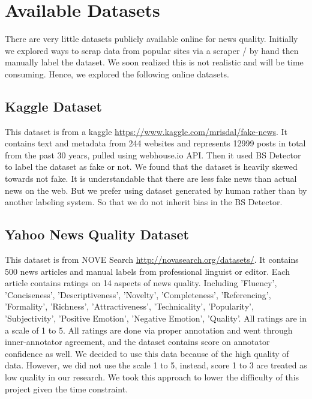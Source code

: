 \documentclass[11pt]{article}
\begin{document}
\section{Available Datasets}

There are very little datasets publicly available online for news quality. Initially we explored ways to scrap data from popular sites via a scraper / by hand then manually label the dataset. We soon realized this is not realistic and will be time consuming. Hence, we explored the following online datasets.

\subsection{Kaggle Dataset}

This dataset is from a kaggle \url{https://www.kaggle.com/mrisdal/fake-news}. It contains text and metadata from 244 websites and represents 12999 posts in total from the past 30 years, pulled using webhouse.io API. Then it used BS Detector to label the dataset as fake or not. We found that the dataset is heavily skewed towards not fake. It is understandable that there are less fake news than actual news on the web. But we prefer using dataset generated by human rather than by another labeling system. So that we do not inherit bias in the BS Detector.  

\subsection{Yahoo News Quality Dataset}

This dataset is from NOVE Search \url{http://novasearch.org/datasets/}. It contains 500 news articles and manual labels from professional linguist or editor. Each article contains ratings on 14 aspects of news quality. Including 'Fluency', 'Conciseness', 'Descriptiveness', 'Novelty', 'Completeness', 'Referencing', 'Formality', 'Richness', 'Attractiveness', 'Technicality', 'Popularity', 'Subjectivity', 'Positive Emotion', 'Negative Emotion', 'Quality'. All ratings are in a scale of 1 to 5. All ratings are done via proper annotation and went through inner-annotator agreement, and the dataset contains score on annotator confidence as well. We decided to use this data because of the high quality of data. However, we did not use the scale 1 to 5, instead, score 1 to 3 are treated as low quality in our research. We took this approach to lower the difficulty of this project given the time constraint. 
\end{document}
